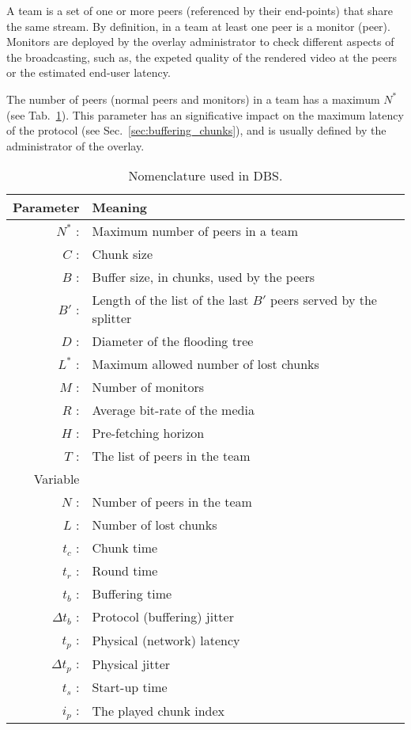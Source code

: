 

\label{sec:team_def}

A team is a set of one or more peers (referenced by their end-points)
that share the same stream. By definition, in a team at least one peer
is a \gls{monitor} (peer). Monitors are deployed by the overlay
administrator to check different aspects of the broadcasting, such as,
the expeted quality of the rendered video at the peers or the
estimated end-user latency.

The number of peers (normal peers and monitors) in a team has a
maximum $N^*$ (see Tab.~\ref{tab:DBS_nomenclature}). This parameter
has an significative impact on the maximum latency of the protocol (see
Sec.~\ref{sec:buffering_chunks}), and is usually defined by the
administrator of the overlay.

\begin{table}[t]
  \centering
  \begin{tabular}{rl}
    Parameter & Meaning \\
    \hline
    $N^*$ :  & Maximum number of peers in a team \\
    $C$ :    & Chunk size \\
    $B$ :    & Buffer size, in chunks, used by the peers \\
    $B'$ :   & Length of the list of the last $B'$ peers served by the splitter \\ 
    $D$ :    & Diameter of the flooding tree \\
    $L^*$ :  & Maximum allowed number of lost chunks \\
    $M$ :    & Number of monitors \\
    $R$ :    & Average bit-rate of the media \\
    $H$ :    & Pre-fetching horizon \\
    $T$ :    & The list of peers in the team \\
    Variable & \\
    \hline
    $N$ :    & Number of peers in the team \\
    $L$ :    & Number of lost chunks \\
    $t_c$ :  & Chunk time \\
    $t_r$ :  & Round time \\
    $t_b$ :  & Buffering time \\
    $\Delta t_b$ : & Protocol (buffering) jitter \\ 
    $t_p$ :  & Physical (network) latency \\
    $\Delta t_p$ : & Physical jitter \\
    $t_s$ :  & Start-up time \\
    $i_p$ :  & The played chunk index 
  \end{tabular}
  \caption{Nomenclature used in DBS.} %
  \label{tab:DBS_nomenclature}
\end{table}

